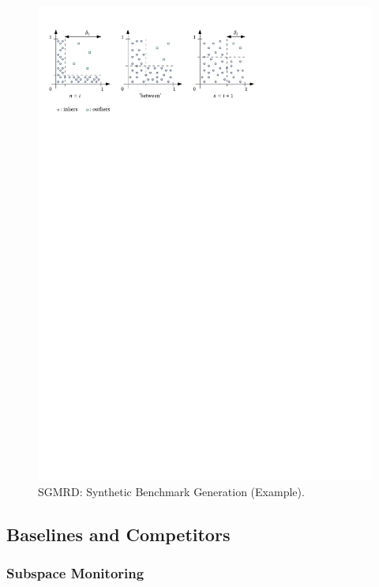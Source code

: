 \begin{figure}
	\includegraphics[width=\linewidth]{part4-figures/outliergeneration3-compressed.pdf}
	\caption{\acrshort{SGMRD}: Synthetic Benchmark Generation (Example).}
	\label{fig:SGMRD_generation}
\end{figure} 

\subsection{Baselines and Competitors}

\subsubsection{Subspace Monitoring} 

